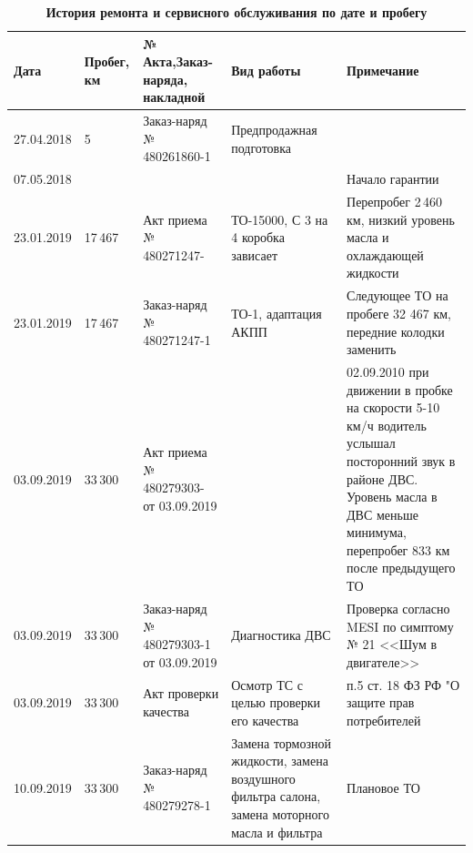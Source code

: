 {\small 
\begin{longtable}{|p{16mm}|p{12mm}|p{29mm}|p{50mm}|p{41mm}|}
	\caption[]{\footnotesize {\textbf{История ремонта и сервисного обслуживания по дате и пробегу}}} \label{tab:hist}\\
	\hline
	\textbf{Дата} &\textbf{Пробег, км} &\textbf{№\,Акта,Заказ-наряда, накладной}& \textbf{Вид работы}& \textbf{Примечание} \\ \hline \endhead %
27.04.2018 & 5  & Заказ-наряд № 480261860-1 & Предпродажная подготовка   &  \\ \hline
%
07.05.2018 &  &  &   & Начало гарантии \\ \hline
%
23.01.2019 & 17\,467 & Акт приема № 480271247-  & ТО-15000, С 3 на 4 коробка зависает  & Перепробег 2\,460 км, низкий уровень масла и охлаждающей жидкости \\ \hline
%
23.01.2019 & 17\,467 &Заказ-наряд № 480271247-1  & ТО-1, адаптация АКПП  & Следующее ТО на пробеге 32 467 км, передние колодки заменить \\ \hline
%

%
03.09.2019 &33\,300  & Акт приема 
		№ 480279303- от 03.09.2019& & 02.09.2010 при движении в пробке на скорости 5-10 км/ч водитель услышал посторонний звук в районе ДВС. Уровень масла в ДВС меньше минимума, перепробег 833 км после предыдущего ТО \\ \hline
%		
03.09.2019 &33\,300  &Заказ-наряд № 480279303-1 от 03.09.2019& Диагностика ДВС  & Проверка согласно MESI по симптому № 21 <<Шум в двигателе>>\\ \hline
%
03.09.2019 &33\,300  &Акт проверки качества&Осмотр ТС с целью проверки его качества& п.5 ст. 18 ФЗ РФ "О защите прав потребителей \\ \hline
%
10.09.2019 & 33\,300 & Заказ-наряд № 480279278-1  & Замена тормозной жидкости, замена воздушного фильтра салона, замена моторного масла и фильтра & Плановое ТО \\ \hline
\end{longtable}}%

